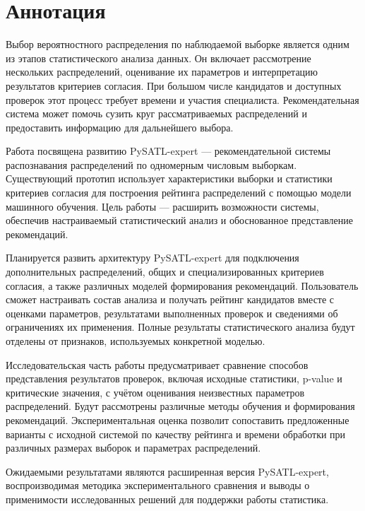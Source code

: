 \begingroup
\section*{Аннотация}

Выбор вероятностного распределения по наблюдаемой выборке является одним из
этапов статистического анализа данных. Он включает рассмотрение нескольких
распределений, оценивание их параметров и интерпретацию результатов критериев
согласия. При большом числе кандидатов и доступных проверок этот процесс
требует времени и участия специалиста. Рекомендательная система может помочь
сузить круг рассматриваемых распределений и предоставить информацию для
дальнейшего выбора.

Работа посвящена развитию PySATL-expert --- рекомендательной системы
распознавания распределений по одномерным числовым выборкам. Существующий
прототип использует характеристики выборки и статистики критериев согласия
для построения рейтинга распределений с помощью модели машинного обучения.
Цель работы --- расширить возможности системы, обеспечив настраиваемый
статистический анализ и обоснованное представление рекомендаций.

Планируется развить архитектуру PySATL-expert для подключения дополнительных
распределений, общих и специализированных критериев согласия, а также
различных моделей формирования рекомендаций. Пользователь сможет
настраивать состав анализа и получать рейтинг кандидатов вместе с оценками
параметров, результатами выполненных проверок и сведениями об ограничениях
их применения. Полные результаты статистического анализа будут отделены
от признаков, используемых конкретной моделью.

Исследовательская часть работы предусматривает сравнение способов
представления результатов проверок, включая исходные статистики, p-value
и критические значения, с учётом оценивания неизвестных параметров
распределений. Будут рассмотрены различные методы обучения и формирования
рекомендаций. Экспериментальная оценка позволит сопоставить предложенные
варианты с исходной системой по качеству рейтинга и времени обработки при
различных размерах выборок и параметрах распределений.

Ожидаемыми результатами являются расширенная версия PySATL-expert,
воспроизводимая методика экспериментального сравнения и выводы о применимости
исследованных решений для поддержки работы статистика.
\clearpage
\endgroup

